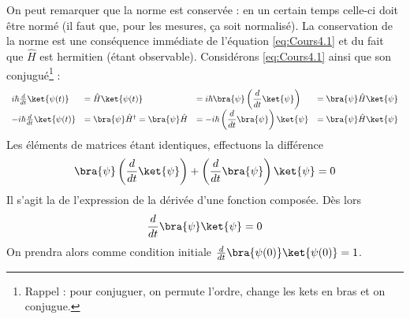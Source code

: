 On peut remarquer que la norme est conservée : en un certain temps celle-ci doit 
être normé (il faut que, pour les mesures, ça soit normalisé). La conservation de 
la norme est une conséquence immédiate de l'équation \autoref{eq:Cours4.1} et du fait 
que $\hat{H}$ est hermitien (étant observable). Considérons \autoref{eq:Cours4.1} ainsi 
que son conjugué\footnote{Rappel : pour conjuguer, on permute l'ordre, change les kets en 
bras et on conjugue.} :
\begin{equation}
\begin{array}{llll}
i\hbar \frac{d}{dt}\ket{\psi(t)} &= \hat{H}\ket{\psi(t)} &= i\hbar \bra{\psi}\left(
\dfrac{d}{dt}\ket{\psi}\right) &= \bra{\psi}\hat{H}\ket{\psi}\\
-i\hbar \frac{d}{dt}\ket{\psi(t)} &= \bra{\psi}\hat{H}^\dagger = \bra{\psi}\hat{H} &=
-i\hbar \left(\dfrac{d}{dt}\bra{\psi}\right)\ket{\psi} &= \bra{\psi}\hat{H}\ket{\psi}
\end{array}
\end{equation}
Les éléments de matrices étant identiques, effectuons la différence
\begin{equation}
\bra{\psi}\left(\dfrac{d}{dt}\ket{\psi}\right)+\left(\dfrac{d}{dt}\bra{\psi}\right)\ket{\psi} = 0
\end{equation}
Il s'agit la de l'expression de la dérivée d'une fonction composée. Dès lors
\begin{equation}
\dfrac{d}{dt}\bra{\psi}\ket{\psi} = 0
\end{equation}
On prendra alors comme condition initiale $\frac{d}{dt}\bra{\psi(0)}\ket{\psi(0)} = 1$.\\

